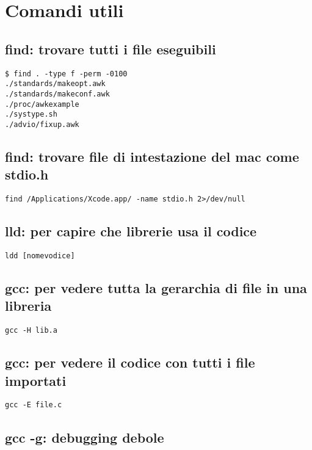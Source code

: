 \newpage
\section{Comandi utili}

\subsection{find: trovare tutti i file eseguibili}
	
\begin{lstlisting}
$ find . -type f -perm -0100
./standards/makeopt.awk
./standards/makeconf.awk
./proc/awkexample
./systype.sh
./advio/fixup.awk
\end{lstlisting}


\subsection{find: trovare file di intestazione del mac come stdio.h}

\begin{lstlisting}
find /Applications/Xcode.app/ -name stdio.h 2>/dev/null
\end{lstlisting}


\subsection{lld: per capire che librerie usa il codice}

\begin{lstlisting}
ldd [nomevodice]
\end{lstlisting}


\subsection{gcc: per vedere tutta la gerarchia di file in una libreria}

\begin{lstlisting}
gcc -H lib.a
\end{lstlisting}


\subsection{gcc: per vedere il codice con tutti i file importati}

\begin{lstlisting}
gcc -E file.c
\end{lstlisting}


\subsection{gcc -g: debugging debole}

